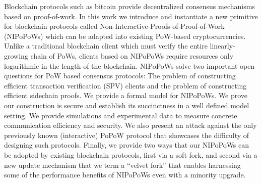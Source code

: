Blockchain protocols such as bitcoin provide decentralized consensus mechanisms
based on proof-of-work. In this work we introduce and instantiate a new
primitive for blockchain protocols called
Non-Interactive-Proofs-of-Proof-of-Work (NIPoPoWs) which can be adapted into
existing PoW-based cryptocurrencies. Unlike a traditional blockchain client
which must verify the entire linearly-growing chain of PoWs, clients based on
NIPoPoWs require resources only logarithmic in the length of the blockchain.
NIPoPoWs solve two important open questions for PoW based consensus protocols:
The problem of constructing efficient transaction verification (SPV) clients and
the problem of constructing efficient sidechain proofs. We provide a formal
model for NIPoPoWs. We prove our construction is secure and establish its
succinctness in a well defined model setting. We provide simulations and
experimental data to measure concrete communication efficiency and security. We
also present an attack against the only previously known (interactive) PoPoW
protocol that showcases the difficulty of designing such protocols. Finally, we
provide two ways that our NIPoPoWs can be adopted by existing blockchain
protocols, first via a soft fork, and second via a new update mechanism that we
term a ``velvet fork'' that enables harnessing some of the performance benefits
of NIPoPoWs even with a minority upgrade.
